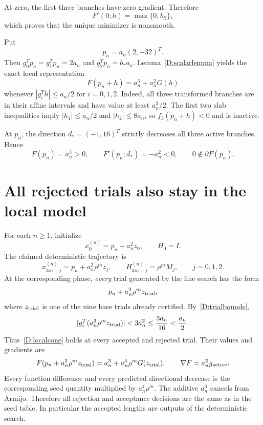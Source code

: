At zero, the first three branches have zero gradient. Therefore
\[
 F'(0;h)=\max\{0,h_2\},
\]
which proves that the unique minimizer is nonsmooth.

Put
\[
 p_n=a_n(2,-32)^T.
\]
Then $g_0^Tp_n=g_1^Tp_n=2a_n$ and $g_2^Tp_n=b_*a_n$. Lemma~\ref{D:scalarlemma} yields the exact local representation
\begin{equation}\label{D:localcone}
 \boxed{F(p_n+h)=a_n^3+a_n^2G(h)}
\end{equation}
whenever $|g_i^Th|\le a_n/2$ for $i=0,1,2$. Indeed, all three transformed branches are in their affine intervals and have value at least $a_n^3/2$. The first two slab inequalities imply $|h_1|\le a_n/2$ and $|h_2|\le8a_n$, so $f_3(p_n+h)<0$ and is inactive.

At $p_n$, the direction $d_*=(-1,16)^T$ strictly decreases all three active branches. Hence
\[
 F(p_n)=a_n^3>0,\qquad
 F'(p_n;d_*)=-a_n^2<0,
 \qquad0\notin\partial F(p_n).
\]


\setcounter{section}{5}
\setcounter{theorem}{1}
\setcounter{lemma}{2}
\setcounter{corollary}{0}
\setcounter{proposition}{0}
\setcounter{remark}{0}
\setcounter{equation}{13}


\section{All rejected trials also stay in the local model}
For each $n\ge1$, initialize
\[
 \boxed{x_0^{(n)}=p_n+a_n^2z_0,\qquad H_0=I.}
\]
The claimed deterministic trajectory is
\begin{equation}\label{D:finalorbit}
 x_{3m+j}^{(n)}=p_n+a_n^2\rho^mz_j,\qquad
 H_{3m+j}^{(n)}=\rho^mM_j,\qquad j=0,1,2.
\end{equation}
At the corresponding phase, \emph{every} trial generated by the line search has the form
\[
 p_n+a_n^2\rho^m z_{\rm trial},
\]
where $z_{\rm trial}$ is one of the nine base trials already certified. By~\eqref{D:trialbounds},
\[
 |g_i^T(a_n^2\rho^mz_{\rm trial})|
 <3a_n^2\le\frac{3a_n}{16}<\frac{a_n}{2}.
\]
Thus~\eqref{D:localcone} holds at every accepted and rejected trial. Their values and gradients are
\[
 F(p_n+a_n^2\rho^mz_{\rm trial})
 =a_n^3+a_n^4\rho^mG(z_{\rm trial}),
 \qquad \nabla F=a_n^2g_{\rm active}.
\]
Every function difference and every predicted directional decrease is the corresponding seed quantity multiplied by $a_n^4\rho^m$. The additive $a_n^3$ cancels from Armijo. Therefore all rejection and acceptance decisions are the same as in the seed table. In particular the accepted lengths are outputs of the deterministic search.

